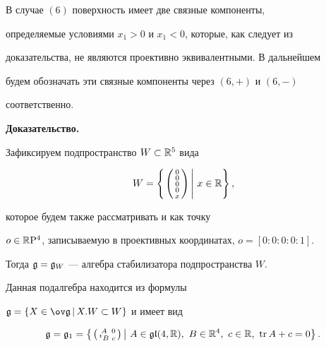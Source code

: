 \begin{note} В случае $(6)$ поверхность имеет две связные компоненты,


определяемые условиями $x_1>0$ и $x_1<0$, которые, как следует из


доказательства, не являются проективно эквивалентными. В дальнейшем


будем обозначать эти связные компоненты через $(6,+)$ и $(6,-)$


соответственно.


\end{note}





{\bf Доказательство.}


Зафиксируем подпространство $W\subset \Bbb R^5$ вида


$$


W=\left\{\left.


\left(\begin{smallmatrix}


0 \\ 0 \\ 0 \\ 0 \\ x


\end{smallmatrix}\right)


\,\right|\,x\in\Bbb R \right\},


$$


которое будем также рассматривать и как точку


$o\in\Bbb R\mathrm{P}^4$, записываемую в проективных координатах, $o=[0:0:0:0:1]$.


Тогда $\frak g=\frak g_W$ --- алгебра стабилизатора подпространства $W$.


Данная подалгебра находится из формулы


$\g=\{ X\in\gb\,|\,X.W\subset W\}$ и имеет вид


$$


\g=\g_1=\left\{\left.


\left(\begin{smallmatrix} A& 0\\ \T{B} &c\end{smallmatrix}


\right)


\,\right|\,A\in\gl(4,\Bbb R),\ B\in


\Bbb R^4,\ c\in\Bbb R,\ \tr A+c=0\right\}.


$$





